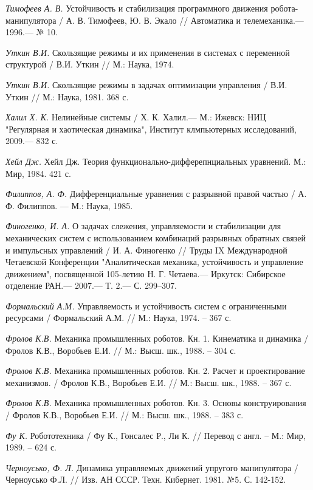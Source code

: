 \begin{thebibliography}{10}
	{\it Тимофеев А. В.} Устойчивость и стабилизация программного движения робота-манипулятора /
	А. В. Тимофеев, Ю. В. Экало // Автоматика и телемеханика.— 1996.— № 10.
	
	{\it Уткин В.И.} Скользящие режимы и их применения в системах с переменной структурой / В.И. Уткин // М.: Наука, 1974.
	
	{\it Уткин В.И.} Скользящие режимы в задачах оптимизации управления / В.И. Уткин // М.: Наука, 1981. 368 с.
	
	{\it Халил Х. К.} Нелинейные системы / Х. К. Халил.— М.: Ижевск: НИЦ "Регулярная и хаотическая динамика", Институт клмпьютерных исследований, 		2009.— 832 с.
	
	{\it Хейл Дж.} Хейл Дж. Теория функционально-дифферепнциальных уравнений. М.: Мир,
	1984. 421 с.
	
	{\it Филиппов, А. Ф.} Дифференциальные уравнения с разрывной правой частью /
	А. Ф. Филиппов. — М.: Наука, 1985.
	
	{\it Финогенко, И. А.} О задачах слежения, управляемости и стабилизации для механических систем с использованием комбинаций разрывных обратных 		связей и импульсных управлений / И. А. Финогенко // Труды IX Международной Четаевской Конференции "Аналитическая механика, устойчивость и 		управление движением", посвященной 105-летию Н. Г. Четаева.— Иркутск: Сибирское отделение РАН.— 2007.— Т. 2.— С. 299–307.
	
	{\it Формальский А.М.} Управляемость и устойчивость систем с ограниченными ресурсами / Формальский А.М. // М.: Наука, 1974. – 367 с.
	
	{\it Фролов К.В.} Механика промышленных роботов. Кн. 1. Кинематика и динамика / Фролов К.В., Воробьев Е.И. // М.: Высш. шк., 1988. – 304 с.
	
	{\it Фролов К.В.} Механика промышленных роботов. Кн. 2. Расчет и проектирование механизмов. / Фролов К.В., Воробьев Е.И. // М.: Высш. шк., 1988. 	– 367 с.
	
	{\it Фролов К.В.} Механика промышленных роботов. Кн. 3. Основы конструирования / Фролов К.В., Воробьев Е.И. // М.: Высш. шк., 1988. – 383 с.
	
	{\it Фу К.} Робототехника / Фу К., Гонсалес Р., Ли К. // Перевод с англ. – М.: Мир, 1989. – 624 с.
	
	{\it Черноусько, Ф. Л.} Динамика управляемых движений упругого манипулятора / Черноусько Ф.Л. // Изв. АН СССР. Техн. Кибернет. 1981. №5. С. 		142-152.
	

\end{thebibliography}
